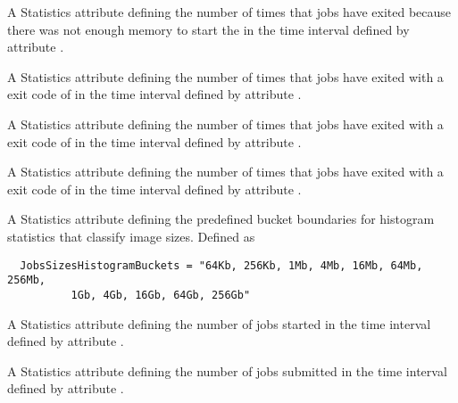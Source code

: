 \begin{description}
\item[\AdAttr{JobsShadowNoMemory}:]  A Statistics attribute defining
  the number of times that jobs have exited 
  because there was not enough memory to start the 
  in the time interval defined by attribute .

\item[\AdAttr{JobsShouldHold}:]  A Statistics attribute defining
  the number of times that jobs 
  have exited with a  exit code of 
  in the time interval defined by attribute .

\item[\AdAttr{JobsShouldRemove}:]  A Statistics attribute defining
  the number of times that jobs 
  have exited with a  exit code of 
  in the time interval defined by attribute .

\item[\AdAttr{JobsShouldRequeue}:]  A Statistics attribute defining
  the number of times that jobs 
  have exited with a  exit code of 
  in the time interval defined by attribute .

\item[\AdAttr{JobsSizesHistogramBuckets}:] A Statistics attribute defining
  the predefined bucket boundaries for histogram statistics that
  classify image sizes.
  Defined as
\footnotesize
\begin{verbatim}
  JobsSizesHistogramBuckets = "64Kb, 256Kb, 1Mb, 4Mb, 16Mb, 64Mb, 256Mb,
          1Gb, 4Gb, 16Gb, 64Gb, 256Gb"
\end{verbatim}
\normalsize

\item[\AdAttr{JobsStarted}:] A Statistics attribute defining
  the number of jobs started
  in the time interval defined by attribute .

\item[\AdAttr{JobsSubmitted}:] A Statistics attribute defining
  the number of jobs submitted
  in the time interval defined by attribute .


\end{description}
